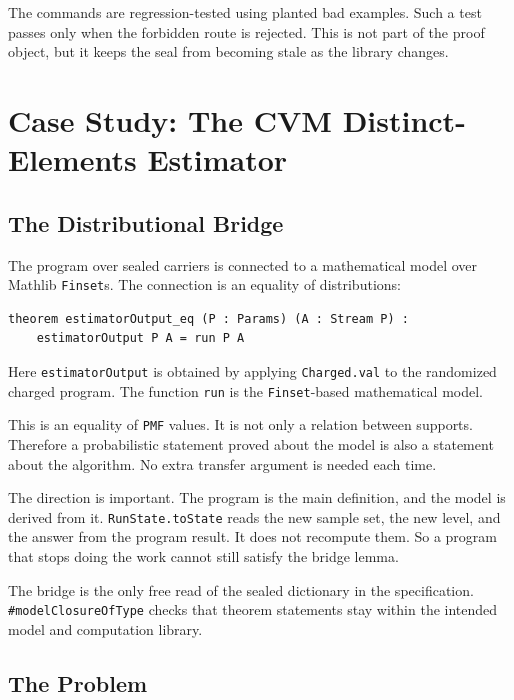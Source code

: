 \documentclass[acmsmall,nonacm]{acmart}
\begin{document}
The commands are regression-tested using planted bad examples.
Such a test passes only when the forbidden route is rejected.
This is not part of the proof object, but it keeps the seal from becoming stale as the library changes.

\section{Case Study: The CVM Distinct-Elements Estimator}\label{sec:case-study}

\subsection{The Distributional Bridge}\label{sec:bridge}

The program over sealed carriers is connected to a mathematical model over Mathlib \lstinline{Finset}s.
The connection is an equality of distributions:

\begin{lstlisting}
theorem estimatorOutput_eq (P : Params) (A : Stream P) :
    estimatorOutput P A = run P A
\end{lstlisting}

Here \lstinline{estimatorOutput} is obtained by applying \lstinline{Charged.val} to the randomized charged program.
The function \lstinline{run} is the \lstinline{Finset}-based mathematical model.

This is an equality of \lstinline{PMF} values.
It is not only a relation between supports.
Therefore a probabilistic statement proved about the model is also a statement about the algorithm.
No extra transfer argument is needed each time.

The direction is important.
The program is the main definition, and the model is derived from it.
\lstinline{RunState.toState} reads the new sample set, the new level, and the answer from the program result.
It does not recompute them.
So a program that stops doing the work cannot still satisfy the bridge lemma.

The bridge is the only free read of the sealed dictionary in the specification.
\lstinline{#modelClosureOfType} checks that theorem statements stay within the intended model and computation library.

\subsection{The Problem}\label{sec:problem}
\end{document}
